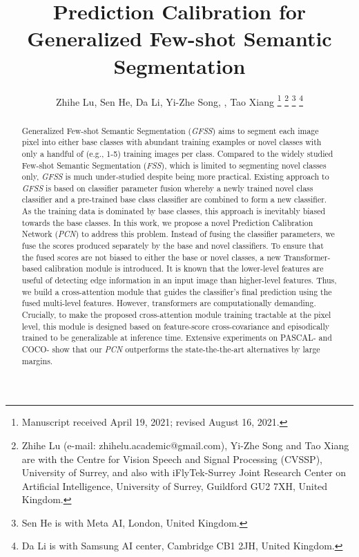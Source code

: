 \documentclass[journal]{IEEEtran}
\begin{document}
\title{Prediction Calibration for Generalized Few-shot Semantic Segmentation}

\author{Zhihe Lu, Sen He, Da Li, Yi-Zhe Song, , Tao Xiang
\thanks{Manuscript received April 19, 2021; revised August 16, 2021.}
\thanks{Zhihe Lu (e-mail: zhihelu.academic@gmail.com), Yi-Zhe Song and Tao Xiang are with the Centre for Vision Speech and Signal Processing (CVSSP), University of Surrey, and also with iFlyTek-Surrey Joint Research Center on Artificial Intelligence, University of Surrey, Guildford GU2 7XH, United Kingdom.}
\thanks{Sen He is with Meta AI, London, United Kingdom.}
\thanks{Da Li is with Samsung AI center, Cambridge CB1 2JH, United Kingdom.}
}




\maketitle

\begin{abstract}
 Generalized Few-shot Semantic Segmentation (\textit{GFSS}) aims to segment each image pixel into either base classes with abundant training examples or novel classes with only a handful of (e.g., 1-5) training images per class. Compared to the widely studied Few-shot Semantic Segmentation (\textit{FSS}), which is limited to segmenting novel classes only, \textit{GFSS} is much under-studied despite being more practical. Existing approach to \textit{GFSS} is based on classifier parameter fusion whereby a  newly trained novel class classifier and a pre-trained base class classifier are combined to form a new classifier. As the training data is dominated by base classes, this approach is inevitably biased towards the base classes. In this work, we propose a novel Prediction Calibration Network (\textit{PCN}) to address this problem. Instead of fusing the classifier parameters, we fuse the scores produced separately by the base and novel classifiers. To ensure that the fused scores are not biased to either the base or novel classes, a new Transformer-based calibration module is introduced. It is known that the lower-level features are useful of detecting edge information in an input image than higher-level features. Thus, we build a cross-attention module that guides the classifier's final prediction using the fused multi-level features. However, transformers are computationally demanding. 
 Crucially, to make the proposed cross-attention module training tractable at the pixel level, this module is designed based on feature-score cross-covariance and episodically trained to be generalizable at inference time. Extensive experiments on PASCAL- and COCO- show that our \textit{PCN} outperforms the state-the-the-art alternatives by large margins.
\end{abstract}
\end{document}
